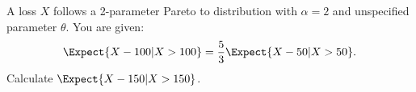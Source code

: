  A loss $X$ follows a 2-parameter Pareto to distribution with 
 $\alpha=2$ and unspecified parameter $\theta$. You are given:
\[
 \Expect{X-100|X>100} = {5\over 3}\Expect{X-50|X>50}.
\]
Calculate $\Expect{X-150|X>150}$.
